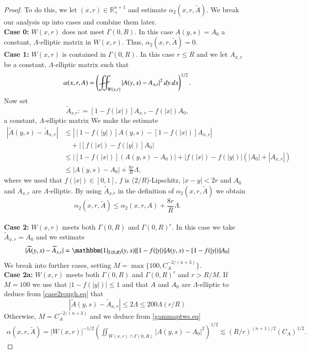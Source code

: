 \documentclass[11pt, a4paper,leqno]{amsart}
\def\Yint#1{\mathchoice
    {\YYint\displaystyle\textstyle{#1}}%
    {\YYint\textstyle\scriptstyle{#1}}%
    {\YYint\scriptstyle\scriptscriptstyle{#1}}%
    {\YYint\scriptscriptstyle\scriptscriptstyle{#1}}%
      \!\iint}
\def\YYint#1#2#3{{\setbox0=\hbox{$#1{#2#3}{\iint}$}
    \vcenter{\hbox{$#2#3$}}\kern-.51\wd0}}
\def\longdash{{-}\mkern-3.5mu{-}}
\def\tiltlongdash{\rotatebox[origin=c]{15}{$\longdash$}}
\def\fiint{\Yint\tiltlongdash}
\theoremstyle{plain}
\theoremstyle{definition}
\theoremstyle{remark}
\numberwithin{equation}{section}
\newcommand{\ree}{\mathbb{R}^{n+1}}
\def\Yint#1{\mathchoice
    {\YYint\displaystyle\textstyle{#1}}%
    {\YYint\textstyle\scriptstyle{#1}}%
    {\YYint\scriptstyle\scriptscriptstyle{#1}}%
    {\YYint\scriptscriptstyle\scriptscriptstyle{#1}}%
      \!\iint}
\def\YYint#1#2#3{{\setbox0=\hbox{$#1{#2#3}{\iint}$}
    \vcenter{\hbox{$#2#3$}}\kern-.51\wd0}}
\def\longdash{{-}\mkern-3.5mu{--}}
\def\tiltlongdash{\rotatebox[origin=c]{15}{$\longdash$}}
\def\fiint{\Yint\tiltlongdash}
\begin{document}
\begin{proof}
To do this, we let $(x,r) \in \ree_+$ and estimate $\alpha_2(x,r, \widetilde{A})$. We break our analysis up into cases and combine them later. \\
{\bf Case 0:} $W(x,r)$ does not meet $\Gamma(0,R)$. In this case $A(y,s) = A_0$ a constant, $\Lambda$-elliptic matrix in $W(x,r)$. Thus, $\alpha_2(x,r, \widetilde{A}) = 0$.
\\ {\bf Case 1:} $W(x,r)$ is contained in $\Gamma(0,R)$. In this case $r \le R$ and we let $A_{x,r}$ be a constant, $\Lambda$-elliptic matrix such that
\[\alpha(x,r, A) =   \left(\fiint_{W(x,r)} |A(y,s) - A_{x,r}|^2 \, dy \, ds\right)^{1/2}.\]
Now set 
\[\widetilde{A}_{x.r} : = [1 - f(|x|)]A_{x,r} -f(|x|) A_0,\]
a constant, $\Lambda$-elliptic matrix
We make the estimate
\begin{align*}
|\widetilde{A}(y,s) - \widetilde{A}_{x,r}| & \le |[1 - f(|y|)]A(y,s) - [1 - f(|x|)]A_{x,r}| 
\\ & \quad + |[f(|x|) - f(|y|)]A_0|
\\ & \le |[1 - f(|x|)](A(y,s) - A_0)| + |f(|x|) - f(|y|)|(|A_0| + |A_{x,r}|)
\\ & \le |A(y,s) - A_0| + \frac{8r}{R} \Lambda,
\end{align*}
where we used that $f(|x|) \in [0,1]$, $f$ is ($2/R$)-Lipschitz, $|x - y| < 2r$ and $A_0$ and $A_{x,r}$ are $\Lambda$-elliptic. By using $\widetilde{A}_{x.r}$ in the definition of $\alpha_2(x,r, \widetilde{A})$ we obtain
\[\alpha_2(x,r, \widetilde{A}) \le \alpha_2(x,r, A) +  \frac{8r}{R} \Lambda.\]
\\
{\bf Case 2:} $W(x,r)$ meets both $\Gamma(0,R)$ and $\Gamma(0,R)^c$. In this case we take $\widetilde{A}_{x,r} = A_0$ and we estimate
\begin{equation}\label{case2rough.eq}
|\widetilde{A}(y,s) -\widetilde{A}_{x,r}| = \mathbbm{1}_{\Gamma(0,R)}(y,s)|[1 - f(|y|)]A(y,s) - [1 - f(|y|)]A_0|
\end{equation}
We break into further cases, setting $M = \max\{100, C_A^{-2/(n+3)}\}$.
\\
{\bf Case 2a:} $W(x,r)$ meets both $\Gamma(0,R)$ and $\Gamma(0,R)^c$ and $r > R/M$. If $M = 100$ we use that $|1 - f(|y|)| \le 1$ and that $A$ and $A_0$ are $\Lambda$-elliptic to deduce from \eqref{case2rough.eq} that 
\[|\widetilde{A}(y,s) -\widetilde{A}_{x,r}| \le 2\Lambda \le 200\Lambda(r/R)\]
Otherwise, $M = C_A^{-2/(n+3)}$ and we deduce from \eqref{gammaptws.eq}
\begin{align*}
\alpha(x,r, \widetilde{A}) =  |W(x,r)|^{-1/2} \left( \iint_{W(x,r) \cap \Gamma(0,R)} |A(y,s) - A_0|^2 \right)^{1/2} \lesssim (R/r)^{(n+1)/2}(C_A)^{1/2}. 

\end{align*}
\end{proof}
\end{document}
